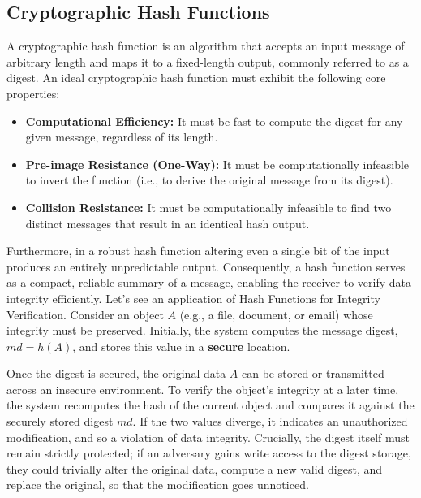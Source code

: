 \subsection{Cryptographic Hash Functions}
A cryptographic hash function is an algorithm that accepts an input message of arbitrary length and maps it to a fixed-length output, commonly referred to as a digest. An ideal cryptographic hash function must exhibit the following core properties:
\begin{itemize}
    \item \textbf{Computational Efficiency:} It must be fast to compute the digest for any given message, regardless of its length.
    \item \textbf{Pre-image Resistance (One-Way):} It must be computationally infeasible to invert the function (i.e., to derive the original message from its digest).
    \item \textbf{Collision Resistance:} It must be computationally infeasible to find two distinct messages that result in an identical hash output.
\end{itemize}
Furthermore, in a robust hash function altering even a single bit of the input produces an entirely unpredictable output. Consequently, a hash function serves as a compact, reliable summary of a message, enabling the receiver to verify data integrity efficiently.
Let's see an application of Hash Functions for Integrity Verification.
Consider an object $A$ (e.g., a file, document, or email) whose integrity must be preserved. Initially, the system computes the message digest, $md = h(A)$, and stores this value in a \textbf{secure} location.

Once the digest is secured, the original data $A$ can be stored or transmitted across an insecure environment. To verify the object's integrity at a later time, the system recomputes the hash of the current object and compares it against the securely stored digest $md$. If the two values diverge, it indicates an unauthorized modification, and so a violation of data integrity. Crucially, the digest itself must remain strictly protected; if an adversary gains write access to the digest storage, they could trivially alter the original data, compute a new valid digest, and replace the original, so that the modification goes unnoticed.

